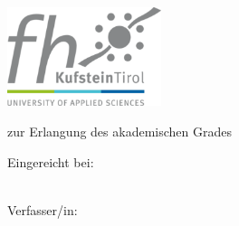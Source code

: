 \thispagestyle{empty}
\begin{titlepage}

  \condTWOSIDE{\changetext{}{19mm}{}{19mm}{}}

  \vspace{1cm}
  \begin{center}
    \hfill\includegraphics[width=4.5cm]{gfx/logo_fh-kufstein} \\ 
  \end{center}
  \vfill

  \begin{center}
    \LARGE \textbf{\myTitle}
  \end{center} 
  \vfill

  \begin{center}
  \end{center}
  \vfill

  \begin{center}
    \Large{zur Erlangung des akademischen Grades}
  \end{center}
  \vfill

  \begin{center}
    \LARGE \textbf{\myDegree}
  \end{center}
  \vfill

  \begin{center}
    \large Eingereicht bei:\\ 
    \vspace{0.1cm}
    \large \textbf{\myUni}\\
    \vspace{0.1cm}
    \large \textbf{\myFaculty}
  \end{center}
  \vfill

  \begin{center}
    \large Verfasser/in:\\
    \vspace{0.1cm}
    \large \textbf{\myName}\\
    \vspace{0.1cm}
    \large \textbf{\myId}\\
  \end{center}
  \vfill


\end{titlepage}
